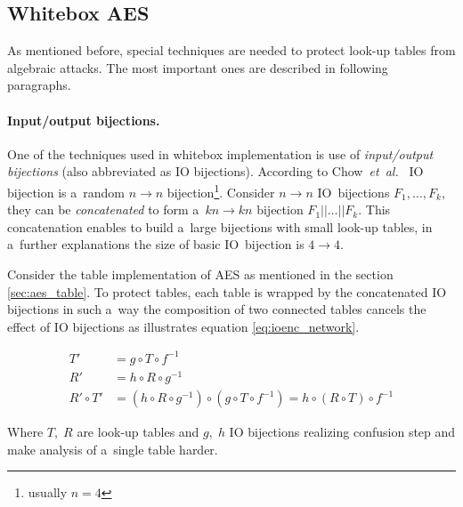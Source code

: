 \documentclass[11pt,oneside,final]{fithesis2}
\newcommand{\eal}{\emph{et~al.}}
\begin{document}
    \subsection{Whitebox AES}\label{sec:whitebox_aes_scheme_chow}
    As mentioned before, special techniques are needed to protect look-up tables from algebraic attacks. The most important ones 
    are described in following paragraphs.
    
    \paragraph*{Input/output bijections.}
    One of the techniques used in whitebox implementation is use of \emph{input/output bijections} (also abbreviated as IO bijections).
    According to Chow~\eal~\citep{Chow02white-boxcryptography} IO bijection is a~random $n\rightarrow n$ bijection\footnote{usually $n=4$}. 
    Consider $n\rightarrow n$ IO~bijections $F_1,\dots,F_k$, they can be \emph{concatenated} to form a~$kn \rightarrow kn$ bijection 
    $F_1||\dots || F_k$. This concatenation enables to build a~large bijections with small look-up tables, in a~further explanations the size of basic 
    IO~bijection is $4 \rightarrow 4$.
    
    Consider the table implementation of AES as mentioned in the section \ref{sec:aes_table}. To protect tables, each table is wrapped by
    the concatenated IO bijections in such a~way the composition of two connected tables cancels the effect of IO bijections as illustrates  
    equation \ref{eq:ioenc_network}.
    
    \begin{subequations}\label{eq:ioenc_network}
    \begin{align}
        T' &= g \circ T \circ f^{-1} \\
        R' &= h \circ R \circ g^{-1} \\
        R' \circ T' &= \left(h \circ R \circ g^{-1}\right) \circ \left(g \circ T \circ f^{-1}\right) = h \circ (R \circ T) \circ f^{-1}
    \end{align}
    \end{subequations}
    
    Where $T,\; R$ are look-up tables and $g,\; h$ IO bijections realizing confusion step and make analysis of a~single table harder.
    
\end{document}

